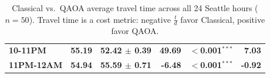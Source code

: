 \documentclass[12pt]{article}
\begin{document}
\begin{table}[H]
\begin{tabular}{lrrrrr}
{\boldmath\bfseries 10-11PM} & {\boldmath\bfseries 55.19} & {\boldmath\bfseries 52.42 $\pm$ 0.39} & {\boldmath\bfseries 49.69} & {\boldmath\bfseries $<$0.001$^{***}$} & {\boldmath\bfseries 7.03} \\
{\boldmath\bfseries 11PM-12AM} & {\boldmath\bfseries 54.94} & {\boldmath\bfseries 55.59 $\pm$ 0.71} & {\boldmath\bfseries -6.48} & {\boldmath\bfseries $<$0.001$^{***}$} & {\boldmath\bfseries -0.92} \\
\bottomrule
\end{tabular}
\caption{Classical vs.\ QAOA average travel time across all 24 Seattle hours ($n=50$).
Travel time is a cost metric: negative $\frac{t}{d}$ favor Classical, positive favor QAOA.}
\label{tab:classical_vs_qaoa_seattle_average_travel_time}
\end{table}
\begin{table}[H]
\centering


\end{table}
\end{document}
